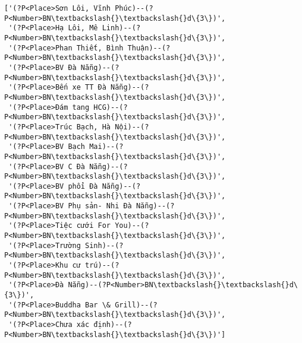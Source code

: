 \documentclass[11pt]{article}
\makeatletter
\newcommand{\boxspacing}{\kern\kvtcb@left@rule\kern\kvtcb@boxsep}
\newcommand{\prompt}[4]{
        \ttfamily\llap{{\color{#2}[#3]:\hspace{3pt}#4}}\vspace{-\baselineskip}
    }
\makeatother
\begin{document}
            \begin{tcolorbox}[breakable, size=fbox, boxrule=.5pt, pad at break*=1mm, opacityfill=0]
\prompt{Out}{outcolor}{352}{\boxspacing}
\begin{Verbatim}[commandchars=\\\{\}]
['(?P<Place>Sơn Lôi, Vĩnh Phúc)--(?P<Number>BN\textbackslash{}\textbackslash{}d\{3\})',
 '(?P<Place>Hạ Lôi, Mê Linh)--(?P<Number>BN\textbackslash{}\textbackslash{}d\{3\})',
 '(?P<Place>Phan Thiết, Bình Thuận)--(?P<Number>BN\textbackslash{}\textbackslash{}d\{3\})',
 '(?P<Place>BV Đà Nẵng)--(?P<Number>BN\textbackslash{}\textbackslash{}d\{3\})',
 '(?P<Place>Bến xe TT Đà Nẵng)--(?P<Number>BN\textbackslash{}\textbackslash{}d\{3\})',
 '(?P<Place>Đám tang HCG)--(?P<Number>BN\textbackslash{}\textbackslash{}d\{3\})',
 '(?P<Place>Trúc Bạch, Hà Nội)--(?P<Number>BN\textbackslash{}\textbackslash{}d\{3\})',
 '(?P<Place>BV Bạch Mai)--(?P<Number>BN\textbackslash{}\textbackslash{}d\{3\})',
 '(?P<Place>BV C Đà Nẵng)--(?P<Number>BN\textbackslash{}\textbackslash{}d\{3\})',
 '(?P<Place>BV phổi Đà Nẵng)--(?P<Number>BN\textbackslash{}\textbackslash{}d\{3\})',
 '(?P<Place>BV Phụ sản- Nhi Đà Nẵng)--(?P<Number>BN\textbackslash{}\textbackslash{}d\{3\})',
 '(?P<Place>Tiệc cưới For You)--(?P<Number>BN\textbackslash{}\textbackslash{}d\{3\})',
 '(?P<Place>Trường Sinh)--(?P<Number>BN\textbackslash{}\textbackslash{}d\{3\})',
 '(?P<Place>Khu cư trú)--(?P<Number>BN\textbackslash{}\textbackslash{}d\{3\})',
 '(?P<Place>Đà Nẵng)--(?P<Number>BN\textbackslash{}\textbackslash{}d\{3\})',
 '(?P<Place>Buddha Bar \& Grill)--(?P<Number>BN\textbackslash{}\textbackslash{}d\{3\})',
 '(?P<Place>Chưa xác định)--(?P<Number>BN\textbackslash{}\textbackslash{}d\{3\})']
\end{Verbatim}
\end{tcolorbox}
        
\end{document}
